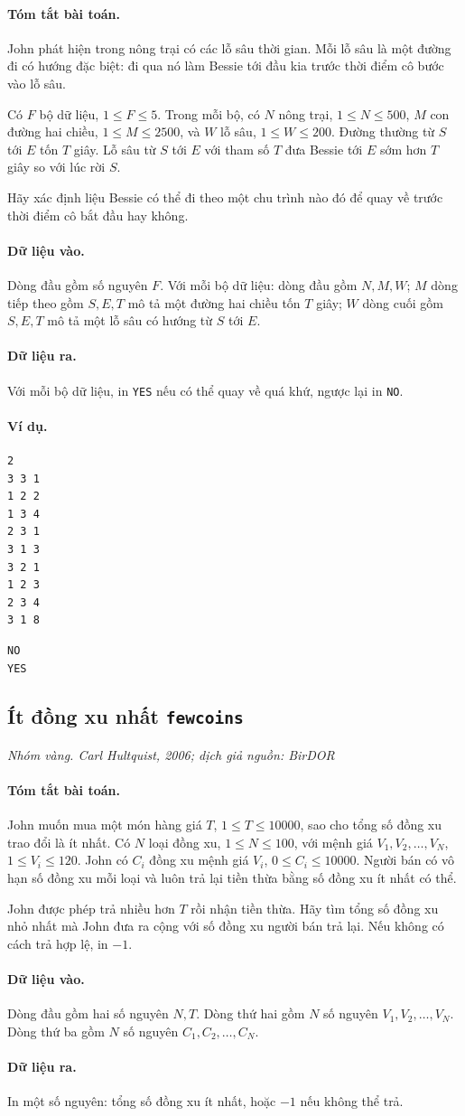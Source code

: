 \documentclass[11pt]{article}
\newcommand{\problem}[4]{%
  \subsection[#1 (#2)]{#1 \hfill {\normalsize\texttt{#2}}}%
  \noindent\textit{#3. #4}\par\smallskip
}
\newcommand{\iosec}[1]{\paragraph{#1}}
\begin{document}
\iosec{Tóm tắt bài toán.}
John phát hiện trong nông trại có các lỗ sâu thời gian. Mỗi lỗ sâu là một
đường đi có hướng đặc biệt: đi qua nó làm Bessie tới đầu kia trước thời điểm
cô bước vào lỗ sâu.

Có \(F\) bộ dữ liệu, \(1\le F\le 5\). Trong mỗi bộ, có \(N\) nông trại,
\(1\le N\le 500\), \(M\) con đường hai chiều, \(1\le M\le 2500\), và \(W\)
lỗ sâu, \(1\le W\le 200\). Đường thường từ \(S\) tới \(E\) tốn \(T\) giây.
Lỗ sâu từ \(S\) tới \(E\) với tham số \(T\) đưa Bessie tới \(E\) sớm hơn
\(T\) giây so với lúc rời \(S\).

Hãy xác định liệu Bessie có thể đi theo một chu trình nào đó để quay về trước
thời điểm cô bắt đầu hay không.

\iosec{Dữ liệu vào.}
Dòng đầu gồm số nguyên \(F\). Với mỗi bộ dữ liệu: dòng đầu gồm \(N,M,W\);
\(M\) dòng tiếp theo gồm \(S,E,T\) mô tả một đường hai chiều tốn \(T\) giây;
\(W\) dòng cuối gồm \(S,E,T\) mô tả một lỗ sâu có hướng từ \(S\) tới \(E\).

\iosec{Dữ liệu ra.}
Với mỗi bộ dữ liệu, in \texttt{YES} nếu có thể quay về quá khứ, ngược lại in
\texttt{NO}.

\iosec{Ví dụ.}
\begin{verbatim}
2
3 3 1
1 2 2
1 3 4
2 3 1
3 1 3
3 2 1
1 2 3
2 3 4
3 1 8
\end{verbatim}

\begin{verbatim}
NO
YES
\end{verbatim}

\problem{Ít đồng xu nhất}{fewcoins}{Nhóm vàng}{Carl Hultquist, 2006; dịch giả nguồn: BirDOR}

\iosec{Tóm tắt bài toán.}
John muốn mua một món hàng giá \(T\), \(1\le T\le 10000\), sao cho tổng số
đồng xu trao đổi là ít nhất. Có \(N\) loại đồng xu, \(1\le N\le 100\), với
mệnh giá \(V_1,V_2,\ldots,V_N\), \(1\le V_i\le 120\). John có \(C_i\) đồng
xu mệnh giá \(V_i\), \(0\le C_i\le 10000\). Người bán có vô hạn số đồng xu
mỗi loại và luôn trả lại tiền thừa bằng số đồng xu ít nhất có thể.

John được phép trả nhiều hơn \(T\) rồi nhận tiền thừa. Hãy tìm tổng số đồng
xu nhỏ nhất mà John đưa ra cộng với số đồng xu người bán trả lại. Nếu không
có cách trả hợp lệ, in \(-1\).

\iosec{Dữ liệu vào.}
Dòng đầu gồm hai số nguyên \(N,T\). Dòng thứ hai gồm \(N\) số nguyên
\(V_1,V_2,\ldots,V_N\). Dòng thứ ba gồm \(N\) số nguyên
\(C_1,C_2,\ldots,C_N\).

\iosec{Dữ liệu ra.}
In một số nguyên: tổng số đồng xu ít nhất, hoặc \(-1\) nếu không thể trả.
\end{document}
